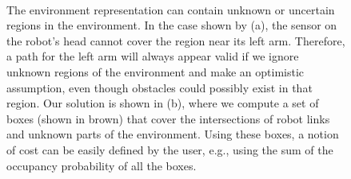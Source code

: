 \begin{figure}[htbp]
\mbox{
\quad
{}
}
\caption[Comparison between the planning algorithms considering and not considering environment uncertainty]{\label{fig:8:unknowncollision} The environment representation can contain unknown
  or uncertain regions in the environment. In the case shown by (a),
  the sensor on the robot's head cannot cover the region near its left
  arm. Therefore, a path for the left arm will always appear
  valid if we ignore unknown regions of the environment and make an optimistic
  assumption, even though obstacles could possibly exist in that
  region. Our solution is shown in (b), where we compute a set of
  boxes (shown in brown) that cover the intersections of robot links
  and unknown parts of the environment. Using these boxes, a notion of
  cost can be easily defined by the user, e.g., using the sum of the occupancy probability of all the boxes. }
\end{figure}





